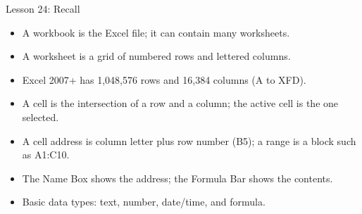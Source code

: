 \documentclass[aspectratio=169]{beamer}
\begin{document}
\begin{frame}{Lesson 24: Recall}
  \begin{itemize}
    \item A workbook is the Excel file; it can contain many worksheets.
    \item A worksheet is a grid of numbered rows and lettered columns.
    \item Excel 2007+ has 1,048,576 rows and 16,384 columns (A to XFD).
    \item A cell is the intersection of a row and a column; the active cell
      is the one selected.
    \item A cell address is column letter plus row number (B5); a range is a
      block such as A1:C10.
    \item The Name Box shows the address; the Formula Bar shows the contents.
    \item Basic data types: text, number, date/time, and formula.
  \end{itemize}
\end{frame}
\end{document}
